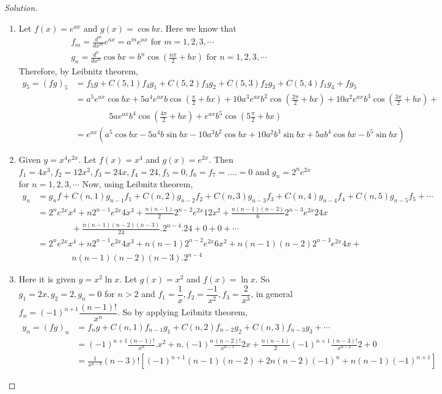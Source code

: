 \documentclass[../../main.tex]{subfiles}
\theoremstyle{definition}
\newenvironment{solution}
    {\begin{proof}[Solution]}
    {\end{proof}}
\begin{document}
\begin{solution}
    \begin{enumerate}[label=(\roman*)]
        \item Let $f(x)=e^{ax}$ and $g(x)=\cos bx$. Here we know that 
\begin{align*}
& f_m=\frac{d^m}{dx^m}e^{ax}=a^me^{ax} \text{ for } m=1,2,3,\cdots \\
& g_n=\frac{d^n}{dx^n}\cos bx=b^n\cos (\frac{n\pi}{2}+bx) \text{ for } n=1,2,3,\cdots
\end{align*}
Therefore, by Leibnitz theorem, 
\begin{align*}
 y_5=(fg)_5 &= f_5g+C(5,1)f_4g_1+C(5,2)f_3g_2+C(5,3)f_2g_3+C(5,4)f_1g_4+fg_5   \\
 &= a^5e^{ax}\cos bx+5a^4e^{ax}b\cos (\frac{\pi}{2}+bx)+10a^3e^{ax}b^2\cos (\frac{2\pi}{2}+bx)+10a^2e^{ax}b^3\cos (\frac{3\pi}{2}+bx)+ \\
 &\qquad\qquad 5ae^{ax}b^4\cos (\frac{4\pi}{2}+bx)+e^{ax}b^5\cos (5\frac{\pi}{2}+bx) \\ 
 &= e^{ax}(a^5\cos bx-5a^4b\sin bx-10a^3b^2\cos bx+10a^2b^3\sin bx+5ab^4\cos bx-b^5\sin bx)
\end{align*}

\item Given $y=x^4e^{2x}$. Let $f(x)=x^4$ and $g(x)=e^{2x}$. Then $f_1=4x^3, f_2=12x^2, f_3=24x, f_4=24,f_5=0, f_6=f_7=....=0$ and $g_n=2^ne^{2x}$ for $n=1,2,3,\cdots$
Now, using Leibnitz theorem, 
\begin{align*}
y_n &= g_nf+C(n,1)g_{n-1}f_1+C(n,2)g_{n-2}f_2+C(n,3)g_{n-3}f_3+C(n,4)g_{n-4}f_4+C(n,5)g_{n-5}f_5+\cdots \\ %
&= 2^ne^{2x}x^4+n2^{n-1}e^{2x}4x^3+\frac{n(n-1)}{2}2^{n-2}e^{2x}12x^2+\frac{n(n-1)(n-2)}{6}2^{n-3}e^{2x}24x \\
&\qquad\qquad+\frac{n(n-1)(n-2)(n-3)}{24}.2^{n-4}.24+0+0+\cdots \\
&= 2^ne^{2x}x^4+n2^{n-1}e^{2x}4x^3+{n(n-1)}2^{n-2}e^{2x}6x^2+n(n-1)(n-2)2^{n-3}e^{2x}4x+\\
&\qquad\qquad{n(n-1)(n-2)(n-3)}.2^{n-4}
\end{align*}

\item Here it is given $y=x^2\ln x$. Let $g(x)=x^2$ and $f(x)=\ln x$. So $g_1=2x, g_2=2,g_n=0$ for $n> 2$ and $f_1=\dfrac{1}{x}, f_2=\dfrac{-1}{x^2},f_3=\dfrac{2}{x^3}$, in general $f_n=(-1)^{n+1}\dfrac{(n-1)!}{x^n}$.
So by applying Leibnitz theorem,
\begin{align*}
y_n=(fg)_n &= f_ng+C(n,1)f_{n-1}g_1+C(n,2)f_{n-2}g_2+C(n,3)f_{n-3}g_3+\cdots \\
&= (-1)^{n+1}\frac{(n-1)!}{x^n}.x^2+n.(-1)^n\frac{(n-2)!}{x^{n-1}}2x+\frac{n(n-1)}{2}(-1)^{n+1}\frac{(n-3)!}{x^{n-2}}2+0 \\
&= \frac{1}{x^{n-2}}(n-3)![(-1)^{n+1}(n-1)(n-2)+2n(n-2)(-1)^n+n(n-1)(-1)^{n+1}]
\end{align*}


\end{enumerate}
\end{solution}
\end{document}
